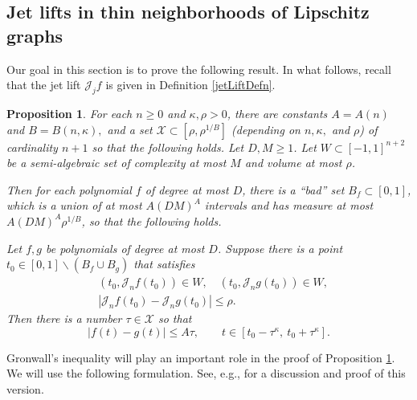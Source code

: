 \documentclass[letterpaper, reqno,11pt]{article}
\numberwithin{equation}{section}
\numberwithin{thm}{section}
\newtheorem{prop}[thm]{Proposition}
\theoremstyle{remark}
\begin{document}

\subsection{Jet lifts in thin neighborhoods of Lipschitz graphs}\label{jetLiftSection}
Our goal in this section is to prove the following result. In what follows, recall that the jet lift $\mathcal{J}_jf$ is given in Definition \ref{jetLiftDefn}.

\begin{prop}\label{cutCurvesAdaptedSASet}
For each $n\geq 0$ and $\kappa,\rho>0$, there are constants $A = A(n)$ and $B=B(n,\kappa),$ and a set $\mathcal{X}\subset[\rho, \rho^{1/B}]$ (depending on $n,\kappa,$ and $\rho$) of cardinality $n+1$ so that the following holds. Let $D,M\geq 1$. Let $W\subset[-1,1]^{n+2}$ be a semi-algebraic set of complexity at most $M$ and volume at most $\rho$. 

Then for each polynomial $f$ of degree at most $D$, there is a ``bad'' set $B_f\subset[0,1]$, which is a union of at most $A(DM)^A$ intervals and has measure at most $A (DM)^A \rho^{1/B}$, so that the following holds. 

Let $f,g$ be polynomials of degree at most $D$. Suppose there is a point $t_0\in [0,1]\backslash(B_f \cup B_g)$ that satisfies
\begin{equation}
\begin{split}
&(t_0, \mathcal{J}_{n}f(t_0))\in W,\quad (t_0, \mathcal{J}_{n}g(t_0))\in W, \label{fCloseToGAndliftOfFInS}\\
&|\mathcal{J}_n f(t_0)-\mathcal{J}_n g(t_0)|\leq \rho.
\end{split}
\end{equation}
%
Then there is a number $\tau\in \mathcal{X}$ so that
\begin{equation}\label{fRhoCloseToG}
|f(t)-g(t)|\leq  A \tau,\qquad t \in [t_0-\tau^\kappa,\ t_0 + \tau^\kappa].
\end{equation}
\end{prop}

Gronwall's inequality will play an important role in the proof of Proposition \ref{cutCurvesAdaptedSASet}. We will use the following formulation. See, e.g., \cite{HowardGron} for a discussion and proof of this version. 
\end{document}
